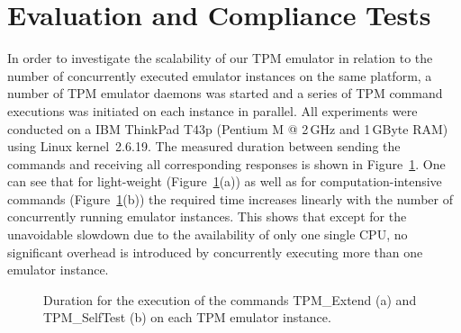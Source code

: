 \documentclass[runningheads]{llncs}
\begin{document}

\section{Evaluation and Compliance Tests}\label{sec:state}
In order to investigate the scalability of our TPM emulator in relation to
the number of concurrently executed emulator instances on the same platform,
a number of TPM emulator daemons was started and a series of TPM command
executions was initiated on each instance in parallel. All experiments were
conducted on a IBM ThinkPad T43p (Pentium M @ 2\,GHz and 1\,GByte RAM) using
Linux kernel~2.6.19. The measured duration between sending the commands and
receiving all corresponding responses is shown in
Figure~\ref{plot:execution_time}. One can see that for light-weight
(Figure~\ref{plot:execution_time}(a)) as well as for computation-intensive
commands (Figure~\ref{plot:execution_time}(b)) the required time increases
linearly with the number of concurrently running emulator instances. This
shows that except for the unavoidable slowdown due to the availability of
only one single CPU, no significant overhead is introduced by concurrently
executing more than one emulator instance.

\begin{figure}
	\begin{center}
		\quad%
		\vspace*{-3mm}
		\caption{Duration for the execution of the commands TPM\_Extend (a) and
			TPM\_SelfTest (b) on each TPM emulator instance.}
		\label{plot:execution_time}
	\end{center}
\end{figure}
\end{document}
